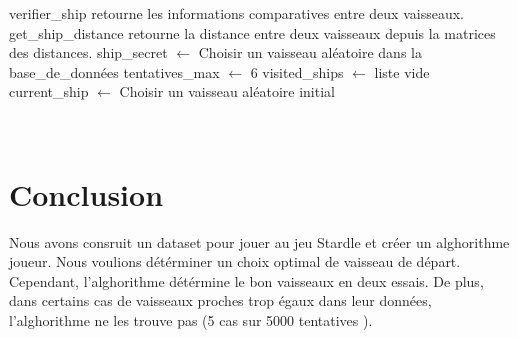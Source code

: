 \documentclass{article}
\begin{document}
\begin{algorithm}[H]
\SetAlgoLined
{}

verifier\_ship retourne les informations comparatives entre deux vaisseaux. 
\newline
get\_ship\_distance retourne la distance entre deux vaisseaux depuis la matrices des distances.
\newline
ship\_secret $\leftarrow$ Choisir un vaisseau aléatoire dans la base\_de\_données 
\newline
tentatives\_max $\leftarrow$ 6 
\newline
visited\_ships $\leftarrow$ liste vide
\newline
current\_ship $\leftarrow$ Choisir un vaisseau aléatoire initial

\;
\end{algorithm}
\\

\section{Conclusion}

Nous avons consruit un dataset pour jouer au jeu Stardle et créer un alghorithme joueur. Nous voulions détérminer un choix optimal de vaisseau de départ. Cependant, l'alghorithme détérmine le bon vaisseaux en deux essais. De plus, dans certains cas de vaisseaux proches trop égaux dans leur données, l'alghorithme ne les trouve pas (5 cas sur 5000 tentatives ). 
\end{document}
